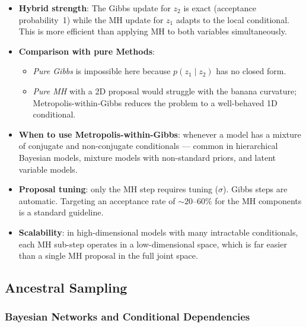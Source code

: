 \documentclass[12pt, a4paper]{article}
\begin{document}
\begin{itemize}
    \item \textbf{Hybrid strength}: The Gibbs update for $z_2$
          is exact (acceptance probability~1) while the MH
          update for $z_1$ adapts to the local conditional.
          This is more efficient than applying MH to both
          variables simultaneously.
    \item \textbf{Comparison with pure Methods}:
          \begin{itemize}
              \item \emph{Pure Gibbs} is impossible here because
                    $p(z_1 \mid z_2)$ has no closed form.
              \item \emph{Pure MH} with a 2D proposal would
                    struggle with the banana curvature;
                    Metropolis-within-Gibbs reduces the problem
                    to a well-behaved 1D conditional.
          \end{itemize}
    \item \textbf{When to use Metropolis-within-Gibbs}:
          whenever a model has a mixture of conjugate and
          non-conjugate conditionals --- common in hierarchical
          Bayesian models, mixture models with non-standard
          priors, and latent variable models.
    \item \textbf{Proposal tuning}: only the MH step requires
          tuning ($\sigma$).  Gibbs steps are automatic.
          Targeting an acceptance rate of $\sim 20$--$60\%$ for
          the MH components is a standard guideline.
    \item \textbf{Scalability}: in high-dimensional models with
          many intractable conditionals, each MH sub-step
          operates in a low-dimensional space, which is far
          easier than a single MH proposal in the full joint
          space.
\end{itemize}

\subsection{Ancestral Sampling}
\label{sec:ancestral}

\subsubsection{Bayesian Networks and Conditional Dependencies}
\end{document}
